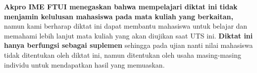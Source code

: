 \textbf{Akpro IME FTUI menegaskan bahwa mempelajari diktat ini tidak menjamin kelulusan mahasiswa pada mata kuliah yang berkaitan,} namun kami berharap diktat ini dapat membantu mahasiswa untuk belajar dan memahami lebih lanjut mata kuliah yang akan diujikan saat UTS ini. \textbf{Diktat ini hanya berfungsi sebagai suplemen} sehingga pada ujian nanti nilai mahasiswa tidak ditentukan oleh diktat ini, namun ditentukan oleh usaha masing-masing individu untuk mendapatkan hasil yang memuaskan.\\
